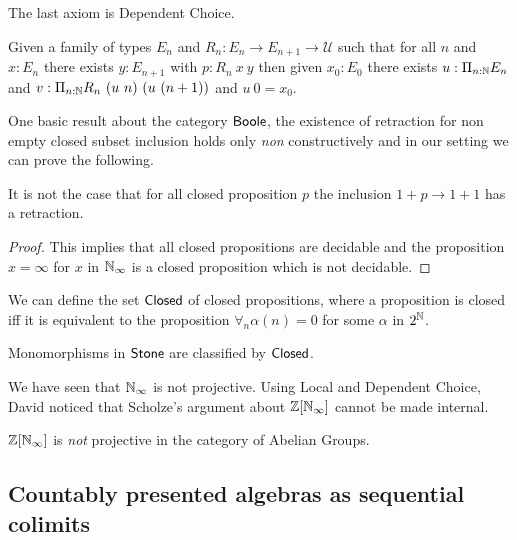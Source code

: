 The last axiom is Dependent Choice.

\begin{axiomNum}
  Given a family of types $E_n$ and $R_n:E_n\rightarrow E_{n+1}\rightarrow {\mathcal U}$ such that
  for all $n$ and $x:E_n$ there exists $y:E_{n+1}$ with $p:R_n~x~y$ then given $x_0:E_0$ there exists
  $u:\Pi_{n:\mathbb{N}}E_n$ and $v:\Pi_{n:\mathbb{N}}R_n~(u~n)~(u~(n+1))$ and $u~0 = x_0$.
\end{axiomNum}

\medskip

One basic result about the category $\mathsf{Boole}$, the existence of retraction for non empty closed subset inclusion
holds only {\em non} constructively and in our setting we can prove the following.


\begin{proposition}
 It is not the case that for all closed proposition $p$ the inclusion $1+p\rightarrow 1+1$ has a retraction.
\end{proposition}

\begin{proof}
  This implies that all closed propositions are decidable and the proposition $x=\infty$ for $x$ in $\mathbb{N}_{\infty}$ is a
  closed proposition which is not decidable.
\end{proof}

\medskip

We can define the set $\mathsf{Closed}$ of closed propositions, where a proposition is closed iff it is equivalent to
the proposition $\forall_n \alpha(n) = 0$ for some $\alpha$ in $2^{\mathbb{N}}$.

\begin{theorem}
  Monomorphisms in $\mathsf{Stone}$ are classified by $\mathsf{Closed}$.
\end{theorem}

\medskip

We have seen that $\mathbb{N}_{\infty}$ is not projective. Using Local and Dependent Choice, David noticed that Scholze's argument
about $\mathbb{Z}[\mathbb{N}_{\infty}]$ cannot be made internal.

\begin{theorem}
   $\mathbb{Z}[\mathbb{N}_{\infty}]$ is {\em not} projective in the category of Abelian Groups.
\end{theorem}



\subsection{Countably presented algebras as sequential colimits}

